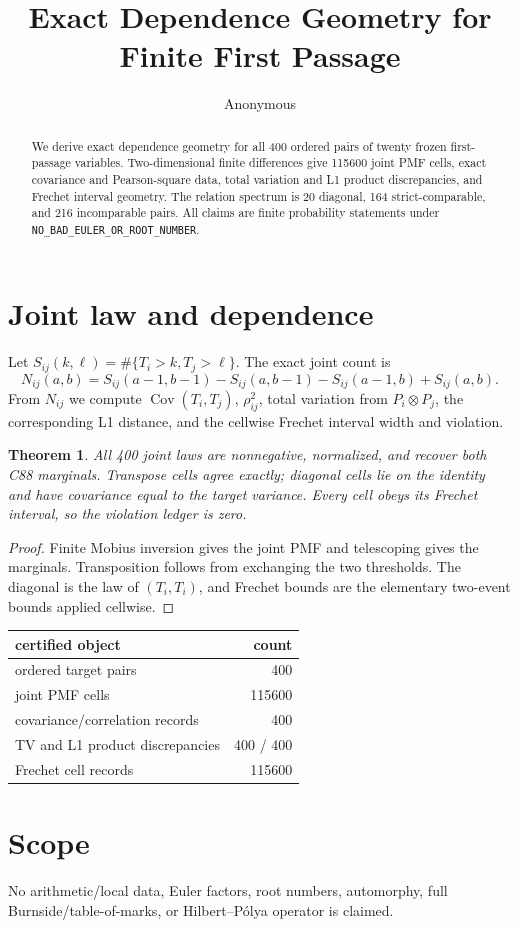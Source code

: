 \documentclass[10pt]{article}
\title{Exact Dependence Geometry for Finite First Passage}
\author{Anonymous}
\date{}
\newtheorem{theorem}{Theorem}
\begin{document}
\maketitle
\begin{abstract}
We derive exact dependence geometry for all 400 ordered pairs of twenty frozen
first-passage variables. Two-dimensional finite differences give 115600 joint
PMF cells, exact covariance and Pearson-square data, total variation and L1
product discrepancies, and Frechet interval geometry. The relation spectrum is
20 diagonal, 164 strict-comparable, and 216 incomparable pairs. All claims are
finite probability statements under \texttt{NO\_BAD\_EULER\_OR\_ROOT\_NUMBER}.
\end{abstract}
\section{Joint law and dependence}
Let $S_{ij}(k,\ell)=\#\{T_i>k,T_j>\ell\}$. The exact joint count is
\[
N_{ij}(a,b)=S_{ij}(a-1,b-1)-S_{ij}(a,b-1)-S_{ij}(a-1,b)+S_{ij}(a,b).
\]
From $N_{ij}$ we compute $\operatorname{Cov}(T_i,T_j)$,
$\rho_{ij}^2$, total variation from $P_i\otimes P_j$, the corresponding L1
distance, and the cellwise Frechet interval width and violation.
\begin{theorem}
All 400 joint laws are nonnegative, normalized, and recover both C88
marginals. Transpose cells agree exactly; diagonal cells lie on the identity
and have covariance equal to the target variance. Every cell obeys its Frechet
interval, so the violation ledger is zero.
\end{theorem}
\begin{proof}
Finite Mobius inversion gives the joint PMF and telescoping gives the
marginals. Transposition follows from exchanging the two thresholds. The
diagonal is the law of $(T_i,T_i)$, and Frechet bounds are the elementary
two-event bounds applied cellwise.
\end{proof}
\begin{center}
\begin{tabular}{lr}
\toprule
certified object & count\\
\midrule
ordered target pairs & 400\\
joint PMF cells & 115600\\
covariance/correlation records & 400\\
TV and L1 product discrepancies & 400 / 400\\
Frechet cell records & 115600\\
\bottomrule
\end{tabular}
\end{center}
\section{Scope}
No arithmetic/local data, Euler factors, root numbers, automorphy, full
Burnside/table-of-marks, or Hilbert--Pólya operator is claimed.
\end{document}
